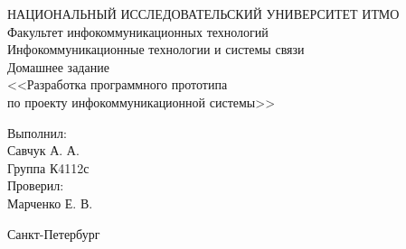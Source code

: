 \begin{titlepage}

  \begin{center}
    НАЦИОНАЛЬНЫЙ ИССЛЕДОВАТЕЛЬСКИЙ УНИВЕРСИТЕТ ИТМО\\[0.1cm]
    Факультет инфокоммуникационных технологий\\
    Инфокоммуникационные технологии и системы связи\\[5cm]

    {\Large Домашнее задание}\\[0.1cm]
    \noindent<<Разработка программного прототипа\\по проекту инфокоммуникационной системы>>\\[3cm]
  \end{center}

  \begin{minipage}{0.65\linewidth}
    \hspace{\fill}
  \end{minipage}
  \begin{minipage}{0.25\linewidth}
    Выполнил:\\
    Савчук А. А.\\
    Группа К4112с \\

    Проверил:\\
    Марченко Е. В.
  \end{minipage}

  \vfill

  \begin{center}
    Санкт-Петербург\\
    \the\year
  \end{center}

\end{titlepage}
